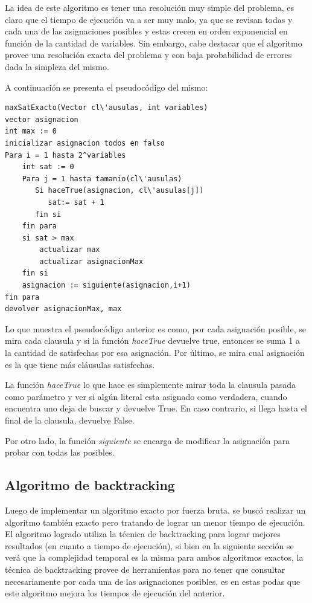 \documentclass[a4paper,10pt]{article}
\begin{document}
La idea de este algoritmo es tener una resoluci\'on muy simple del problema, es claro que el tiempo de ejecuci\'on va a ser muy malo, ya que se revisan todas y cada una de las asignaciones posibles y estas crecen en orden exponencial en funci\'on de la cantidad de variables. Sin embargo, cabe destacar que el algoritmo provee una resoluci\'on exacta del problema y con baja probabilidad de errores dada la simpleza del mismo.

A continuaci\'on se presenta el pseudoc\'odigo del mismo:

\begin{verbatim}
maxSatExacto(Vector cl\'ausulas, int variables)
vector asignacion
int max := 0
inicializar asignacion todos en falso
Para i = 1 hasta 2^variables
    int sat := 0
    Para j = 1 hasta tamanio(cl\'ausulas)
       Si haceTrue(asignacion, cl\'ausulas[j])
          sat:= sat + 1
       fin si
    fin para
    si sat > max
        actualizar max
        actualizar asignacionMax
    fin si
    asignacion := siguiente(asignacion,i+1)
fin para
devolver asignacionMax, max
\end{verbatim}

Lo que muestra el pseudoc\'odigo anterior es como, por cada asignaci\'on posible, se mira cada clausula y si la funci\'on \emph{haceTrue} devuelve true, entonces se suma 1 a la cantidad de satisfechas por esa asignaci\'on. Por \'ultimo, se mira cual asignaci\'on es la que tiene m\'as cl\'ausulas satisfechas.

La funci\'on \emph{haceTrue} lo que hace es simplemente mirar toda la clausula pasada como par\'ametro y ver si alg\'un literal esta asignado como verdadera, cuando encuentra uno deja de buscar y devuelve True. En caso contrario, si llega hasta el final de la clausula, devuelve False. 

Por otro lado, la funci\'on \emph{siguiente} se encarga de modificar la asignaci\'on para probar con todas las posibles.

\subsection*{Algoritmo de backtracking}

Luego de implementar un algoritmo exacto por fuerza bruta, se busc\'o realizar un algoritmo tambi\'en exacto pero tratando de lograr un menor tiempo de ejecuci\'on. El algoritmo logrado utiliza la t\'ecnica de backtracking para lograr mejores resultados (en cuanto a tiempo de ejecuci\'on), si bien en la siguiente secci\'on se ver\'a que la complejidad temporal es la misma para ambos algoritmos exactos, la t\'ecnica de backtracking provee de herramientas para no tener que consultar necesariamente por cada una de las asignaciones posibles, es en estas podas que este algoritmo mejora los tiempos de ejecuci\'on del anterior.
\end{document}
